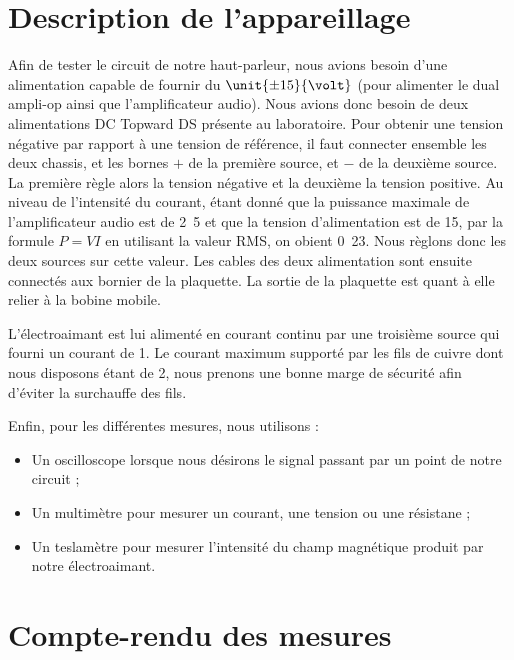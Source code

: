 

\section{Description de l'appareillage}
Afin de tester le circuit de notre haut-parleur, nous avions besoin d'une alimentation
capable de fournir du $\unit{\pm 15}{\volt}$ (pour alimenter le dual ampli-op ainsi
que l'amplificateur audio). Nous avions donc besoin de deux alimentations DC Topward 
 DS présente au laboratoire. Pour obtenir une tension négative par 
rapport à une tension de référence, il faut connecter ensemble les deux chassis,
et les bornes $+$ de la première source, et $-$ de la deuxième source. La première règle
alors la tension négative et la deuxième la tension positive\cite{dctopward}.
Au niveau de l'intensité du courant, étant donné que la puissance maximale de l'amplificateur
audio est de \unit{2.5}{\watt}\cite{datasheetampli} et que la tension d'alimentation est de \unit{15}{\volt}, par
la formule $P = VI$ en utilisant la valeur RMS, on obient \unit{0.23}{\ampere}. Nous règlons
donc les deux sources sur cette valeur. Les cables des deux alimentation sont ensuite connectés 
aux bornier de la plaquette. La sortie de la plaquette est quant à elle relier à la bobine mobile.

L'électroaimant est lui alimenté en courant continu par une troisième source qui 
fourni un courant de \unit{1}{\ampere}. Le courant maximum supporté par les fils de 
cuivre dont nous disposons étant de \unit{2}{\ampere}\cite{norme-cuivre}, nous prenons
une bonne marge de sécurité afin d'éviter la surchauffe des fils.

Enfin, pour les différentes mesures, nous utilisons :

\begin{itemize}
	\item Un oscilloscope lorsque nous désirons le signal passant par un point de notre circuit ;
	\item Un multimètre pour mesurer un courant, une tension ou une résistane ;
	\item Un teslamètre pour mesurer l'intensité du champ magnétique produit par notre électroaimant.
\end{itemize}

\section{Compte-rendu des mesures}

